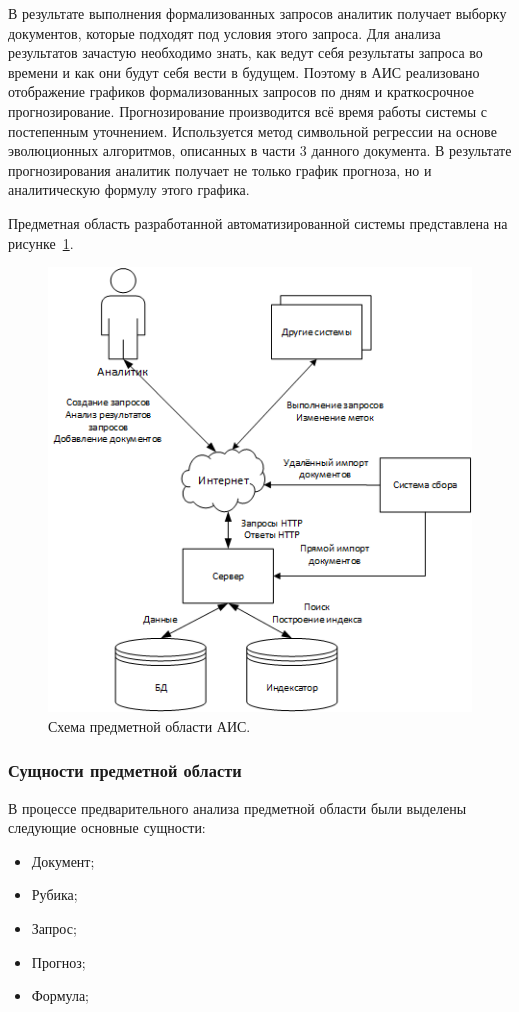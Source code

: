 В результате выполнения формализованных запросов аналитик получает выборку документов, которые подходят под условия этого запроса. Для анализа результатов зачастую необходимо знать, как ведут себя результаты запроса во времени и как они будут себя вести в будущем. Поэтому в АИС реализовано отображение графиков формализованных запросов по дням и краткосрочное прогнозирование. Прогнозирование производится всё время работы системы с постепенным уточнением. Используется метод символьной регрессии на основе эволюционных алгоритмов, описанных в части 3 данного документа. В результате прогнозирования аналитик получает не только график прогноза, но и аналитическую формулу этого графика.

Предметная область разработанной автоматизированной системы представлена на
рисунке~\ref{figure:domain}.

\begin{figure}[!h]
\centering
\includegraphics{design/domain}
\caption{Схема предметной области АИС.}
\label{figure:domain}
\end{figure}

\subsubsection{Сущности предметной области}

В процессе предварительного анализа предметной области были выделены следующие основные сущности:
\begin{itemize}
\item Документ;
\item Рубика;
\item Запрос;
\item Прогноз;
\item Формула;
\end{itemize}

